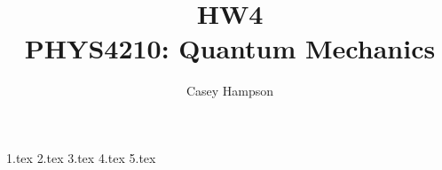 \documentclass[titlepage]{article}
\title{HW4 \\[5pt] PHYS4210: Quantum Mechanics}
\author{Casey Hampson}
\begin{document}
    \maketitle
    \pagebreak

    {1.tex}
    {2.tex}
    {3.tex}
    {4.tex}
    {5.tex}
\end{document}
